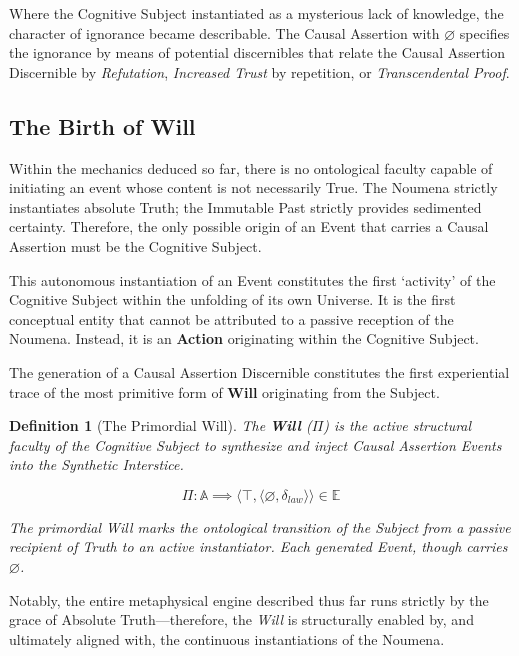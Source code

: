 \documentclass[11pt, a4paper]{article}
\theoremstyle{formalism}
\newtheorem{formalism}{Definition}
\begin{document}
Where the Cognitive Subject instantiated as a mysterious lack of knowledge, 
the character of ignorance became describable. The Causal Assertion with 
$\varnothing$ specifies the ignorance by means of potential discernibles
that relate the Causal Assertion Discernible by {\it Refutation},
{\it Increased Trust\/} by repetition, or {\it Transcendental Proof}.

\subsection{The Birth of Will}

Within the mechanics deduced so far, there is no ontological faculty capable of
initiating an event whose content is not necessarily True. The Noumena
strictly instantiates absolute Truth; the Immutable Past strictly provides
sedimented certainty. Therefore, the only possible origin of an Event that carries
a Causal Assertion must be the Cognitive Subject.


This autonomous instantiation of an Event constitutes the first `activity' of
the Cognitive Subject within the unfolding of its own Universe. It is the first
conceptual entity that cannot be attributed to a passive reception of the
Noumena. Instead, it is an \textbf{Action} originating within the Cognitive
Subject. 

The generation of a Causal Assertion Discernible constitutes the first
experiential trace of the most primitive form of \textbf{Will} originating from
the Subject. 

\begin{formalism}[The Primordial Will]

    The \textbf{Will} ($\Pi$) is the active structural faculty of the Cognitive
    Subject to synthesize and inject Causal Assertion Events into the Synthetic
    Interstice. 
    
    \begin{equation}
        \Pi : \mathbb{A} \implies \langle \top, \langle \varnothing, \delta_{law} \rangle \rangle \in \mathbb{E}
    \end{equation}

    The primordial Will marks the ontological transition of the Subject from a
    passive recipient of Truth to an active instantiator. Each generated Event, 
    though carries $\varnothing$.

\end{formalism}

Notably, the entire metaphysical engine described thus far runs strictly by the
grace of Absolute Truth---therefore, the \textit{Will} is structurally enabled
by, and ultimately aligned with, the continuous instantiations of the Noumena.
\end{document}
